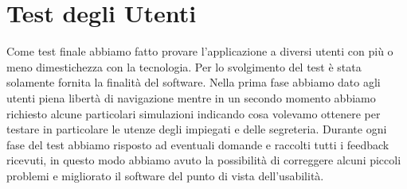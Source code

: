 \documentclass[a4paper, 11pt,oneside]{book}
\begin{document}
    \section{Test degli Utenti}
    Come test finale abbiamo fatto provare l'applicazione a diversi utenti con più o meno dimestichezza con la tecnologia. Per lo svolgimento del test è stata solamente fornita la finalità del software. Nella prima fase abbiamo dato agli utenti piena libertà di navigazione mentre in un secondo momento abbiamo richiesto
    alcune particolari simulazioni indicando cosa volevamo ottenere per testare in particolare le utenze degli impiegati e delle segreteria. Durante ogni fase del test abbiamo risposto ad eventuali domande e raccolti tutti i feedback ricevuti, in questo modo abbiamo avuto la possibilità di correggere alcuni piccoli 
    problemi e migliorato
    il software del punto di vista dell'usabilità.



\end{document}
